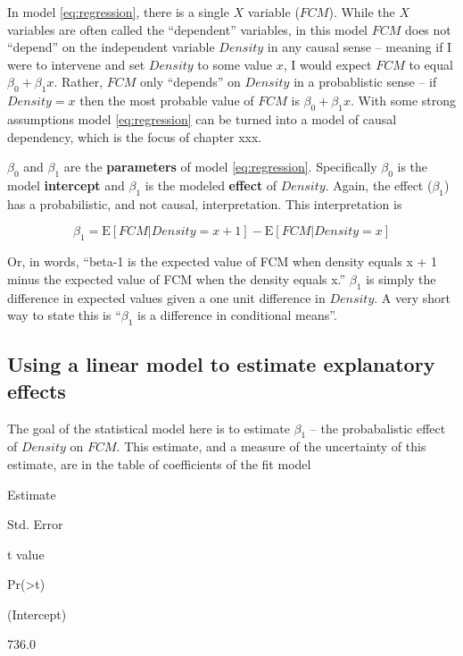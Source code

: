 \documentclass[]{book}
\begin{document}
In model \eqref{eq:regression}, there is a single \(X\) variable
(\(FCM\)). While the \(X\) variables are often called the ``dependent''
variables, in this model \(FCM\) does not ``depend'' on the independent
variable \(Density\) in any causal sense -- meaning if I were to
intervene and set \(Density\) to some value \(x\), I would expect
\(FCM\) to equal \(\beta_0 + \beta_1 x\). Rather, \(FCM\) only
``depends'' on \(Density\) in a probablistic sense -- if \(Density = x\)
then the most probable value of \(FCM\) is \(\beta_0 + \beta_1 x\). With
some strong assumptions model \eqref{eq:regression} can be turned into a
model of causal dependency, which is the focus of chapter xxx.

\(\beta_0\) and \(\beta_1\) are the \textbf{parameters} of model
\eqref{eq:regression}. Specifically \(\beta_0\) is the model
\textbf{intercept} and \(\beta_1\) is the modeled \textbf{effect} of
\(Density\). Again, the effect (\(\beta_1\)) has a probabilistic, and
not causal, interpretation. This interpretation is

\begin{equation}
\beta_1 = \textrm{E}[FCM|Density=x+1] - \textrm{E}[FCM|Density=x] 
\label{eq:beta1}
\end{equation}

Or, in words, ``beta-1 is the expected value of FCM when density equals
x + 1 minus the expected value of FCM when the density equals x.''
\(\beta_1\) is simply the difference in expected values given a one unit
difference in \(Density\). A very short way to state this is
``\(\beta_1\) is a difference in conditional means''.

\subsection{Using a linear model to estimate explanatory
effects}\label{using-a-linear-model-to-estimate-explanatory-effects}

The goal of the statistical model here is to estimate \(\beta_1\) -- the
probabalistic effect of \(Density\) on \(FCM\). This estimate, and a
measure of the uncertainty of this estimate, are in the table of
coefficients of the fit model

Estimate

Std. Error

t value

Pr(\textgreater{}\textbar{}t\textbar{})

(Intercept)

736.0
\end{document}
